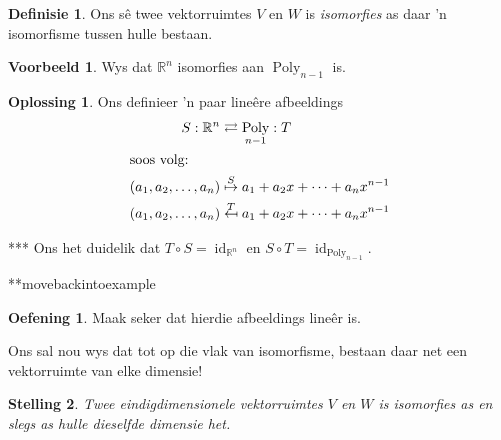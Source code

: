 \documentclass[a4paper,11pt]{book}
\newtheorem{theorem}{Stelling}
\theoremstyle{definition}
\newtheorem{definition}[theorem]{Definisie}
\newtheorem{exercise}{Oefening}
\newtheorem{example_environment}{Voorbeeld}[chapter]
\newtheorem*{solution}{Oplossing}
\newenvironment{example}
	{
		\begin{oframed}
		\begin{example_environment}
	}
	{
		\end{example_environment}
		\end{oframed}
	}
\DeclareMathOperator{\Poly}{Poly}
\DeclareMathOperator{\id}{id}
\begin{document}
\begin{definition} Ons s{\^e} twee vektorruimtes $V$ en $W$ is
	\emph{isomorfies} as daar 'n isomorfisme tussen hulle bestaan.
\end{definition}

\begin{example} Wys dat $\mathbb{R}^n$ isomorfies aan $\Poly_{n-1}$ is.
	\begin{solution} Ons definieer 'n paar line{\^e}re afbeeldings
		\begin{align*}
			S : \mathbb{R}^n & \rightleftarrows \Poly_{n-1} : T \\
			\intertext{soos volg:}
			(a_1, a_2, \ldots, a_n) & \stackrel{S}{\mapsto} a_1 + a_2 x +
			\cdots + a_n x^{n-1} \\
			(a_1, a_2, \ldots, a_n) & \stackrel{T}{\mapsfrom} a_1 + a_2 x +
			\cdots + a_n x^{n-1} 
		\end{align*}
	\end{solution}
***	
	Ons het duidelik dat $T \circ S = \id_{\mathbb{R}^n}$ en $S \circ T =
	\id_{\Poly_{n-1}}$.
\end{example}***movebackintoexample
\begin{exercise} Maak seker dat hierdie afbeeldings line{\^e}r is.
\end{exercise}
Ons sal nou wys dat tot op die vlak van isomorfisme, bestaan daar net een
vektorruimte van elke dimensie!
\begin{theorem} Twee eindigdimensionele vektorruimtes $V$ en $W$ is
	isomorfies as en slegs as hulle dieselfde dimensie het.
\end{theorem}
\end{document}
